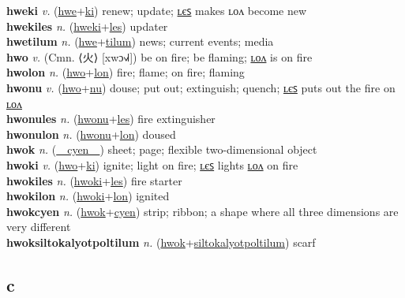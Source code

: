 \textbf{hweki} \textit{v.} (\hyperref[hwe]{hwe}+\hyperref[ki]{ki})
renew; update; \hyperref[hwekiles]{ʟєꜱ} makes ʟᴏᴧ become new \label{hweki} \\
\textbf{hwekiles} \textit{n.} (\hyperref[hweki]{hweki}+\hyperref[les]{les})
updater \label{hwekiles} \\
\textbf{hwetilum} \textit{n.} (\hyperref[hwe]{hwe}+\hyperref[tilum]{tilum})
news; current events; media \label{hwetilum} \\
\textbf{hwo} \textit{v.} (Cmn. ⟨火⟩ [xwɔ˧˩˧])
be on fire; be flaming; \hyperref[hwolon]{ʟᴏᴧ} is on fire \label{hwo} \\
\textbf{hwolon} \textit{n.} (\hyperref[hwo]{hwo}+\hyperref[lon]{lon})
fire; flame; on fire; flaming \label{hwolon} \\
\textbf{hwonu} \textit{v.} (\hyperref[hwo]{hwo}+\hyperref[nu]{nu})
douse; put out; extinguish; quench; \hyperref[hwonules]{ʟєꜱ} puts out the fire on \hyperref[hwonulon]{ʟᴏᴧ} \label{hwonu} \\
\textbf{hwonules} \textit{n.} (\hyperref[hwonu]{hwonu}+\hyperref[les]{les})
fire extinguisher \label{hwonules} \\
\textbf{hwonulon} \textit{n.} (\hyperref[hwonu]{hwonu}+\hyperref[lon]{lon})
doused \label{hwonulon} \\
\textbf{hwok} \textit{n.} (\hyperref[cyen]{~~cyen~~})
sheet; page; flexible two-dimensional object \label{hwok} \\
\textbf{hwoki} \textit{v.} (\hyperref[hwo]{hwo}+\hyperref[ki]{ki})
ignite; light on fire; \hyperref[hwokiles]{ʟєꜱ} lights \hyperref[hwokilon]{ʟᴏᴧ} on fire \label{hwoki} \\
\textbf{hwokiles} \textit{n.} (\hyperref[hwoki]{hwoki}+\hyperref[les]{les})
fire starter \label{hwokiles} \\
\textbf{hwokilon} \textit{n.} (\hyperref[hwoki]{hwoki}+\hyperref[lon]{lon})
ignited \label{hwokilon} \\
\textbf{hwokcyen} \textit{n.} (\hyperref[hwok]{hwok}+\hyperref[cyen]{cyen})
strip; ribbon; a shape where all three dimensions are very different \label{hwokcyen} \\
\textbf{hwoksiltokalyotpoltilum} \textit{n.} (\hyperref[hwok]{hwok}+\hyperref[siltokalyotpoltilum]{siltokalyotpoltilum})
scarf \label{hwoksiltokalyotpoltilum} \\
\subsection{c}

